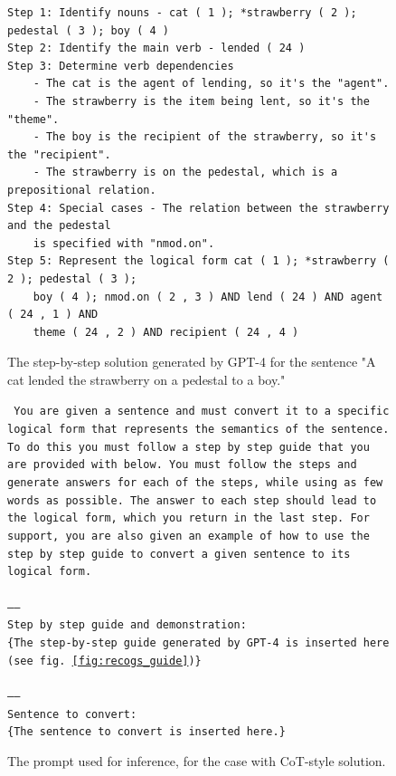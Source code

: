 \documentclass[11pt]{article}
\begin{document}
    \begin{figure}
        \small
        \begin{verbatim}
Step 1: Identify nouns - cat ( 1 ); *strawberry ( 2 ); pedestal ( 3 ); boy ( 4 )
Step 2: Identify the main verb - lended ( 24 )
Step 3: Determine verb dependencies
    - The cat is the agent of lending, so it's the "agent".
    - The strawberry is the item being lent, so it's the "theme".
    - The boy is the recipient of the strawberry, so it's the "recipient".
    - The strawberry is on the pedestal, which is a prepositional relation.
Step 4: Special cases - The relation between the strawberry and the pedestal
    is specified with "nmod.on".
Step 5: Represent the logical form cat ( 1 ); *strawberry ( 2 ); pedestal ( 3 );
    boy ( 4 ); nmod.on ( 2 , 3 ) AND lend ( 24 ) AND agent ( 24 , 1 ) AND
    theme ( 24 , 2 ) AND recipient ( 24 , 4 )
        \end{verbatim}
        \caption{The step-by-step solution generated by GPT-4 for the sentence
        "A cat lended the strawberry on a pedestal to a boy."}
        \label{fig:gpt4_guide}
    \end{figure}

    \begin{figure}
        \small
        \texttt{
        You are given a sentence and must convert it to a specific logical form that
        represents the semantics of the sentence. To do this you must follow a step
        by step guide that you are provided with below. You must follow the steps and
        generate answers for each of the steps, while using as few words as possible.
        The answer to each step should lead to the logical form, which you return in
        the last step. For support, you are also given an example of how to use the
        step by step guide to convert a given sentence to its logical form.\\
        \\
        -----\\
        Step by step guide and demonstration:\\
        {\color{red}\{The step-by-step guide generated by GPT-4 is inserted here (see fig. \ref{fig:recogs_guide})\}}\\
        \\
        -----\\
        Sentence to convert:\\
            {\color{red}\{The sentence to convert is inserted here.\}}
        }
        \caption{The prompt used for inference, for the case with CoT-style solution.}
        \label{fig:prompt_using_guide}
    \end{figure}
\end{document}
